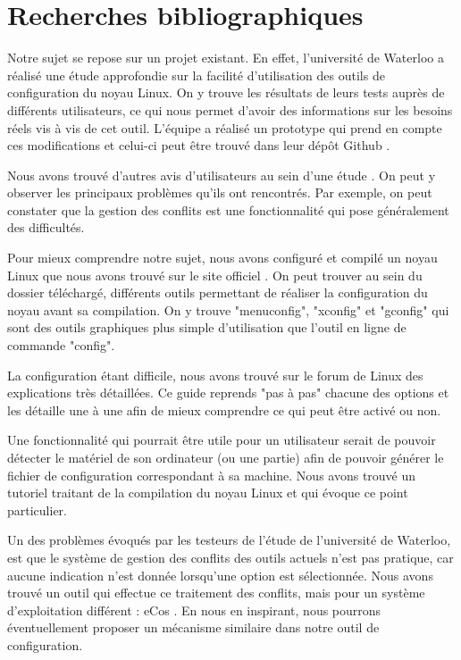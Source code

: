 \documentclass[16pts]{report}
\begin{document}
\chapter{Recherches bibliographiques}

Notre sujet se repose sur un projet existant. En effet, l'université de Waterloo
a réalisé une étude approfondie \cite{Waterloo:Etude} sur la facilité
d'utilisation des outils de configuration du noyau Linux. On y trouve les
résultats de leurs tests auprès de différents utilisateurs, ce qui nous permet
d'avoir des informations sur les besoins réels vis à vis de cet outil. L'équipe
a réalisé un prototype qui prend en compte ces modifications et celui-ci peut
être trouvé dans leur dépôt Github \cite{Waterloo:Github}.

Nous avons trouvé d'autres avis d'utilisateurs au sein d'une étude
\cite{Hubaux:2012:USC:2110147.2110164}. On peut y observer les principaux
problèmes qu'ils ont rencontrés. Par exemple, on peut constater que la gestion
des conflits est une fonctionnalité qui pose généralement des difficultés.

Pour mieux comprendre notre sujet, nous avons configuré et compilé un noyau
Linux que nous avons trouvé sur le site officiel \cite{Kernel}. On peut trouver
au sein du dossier téléchargé, différents outils permettant de réaliser la
configuration du noyau avant sa compilation. On y trouve "menuconfig", "xconfig"
et "gconfig" qui sont des outils graphiques plus simple d'utilisation que
l'outil en ligne de commande "config".

La configuration étant difficile, nous avons trouvé sur le forum de Linux
\cite{Existant:Kernel:ForumTutoConfig} des explications très détaillées. Ce
guide reprends "pas à pas" chacune des options et les détaille une à une afin de
mieux comprendre ce qui peut être activé ou non.

Une fonctionnalité qui pourrait être utile pour un utilisateur serait de pouvoir
détecter le matériel de son ordinateur (ou une partie) afin de pouvoir générer
le fichier de configuration correspondant à sa machine. Nous avons trouvé un
tutoriel \cite{Existant:Kernel:outils} traitant de la compilation du noyau Linux
et qui évoque ce point particulier.

Un des problèmes évoqués par les testeurs de l'étude \cite{Waterloo:Etude} de
l'université de Waterloo, est que le système de gestion des conflits des outils
actuels n'est pas pratique, car aucune indication n'est donnée lorsqu'une option
est sélectionnée. Nous avons trouvé un outil qui effectue ce traitement des
conflits, mais pour un système d'exploitation différent : eCos
\cite{Existant:EcosConfig}. En nous en inspirant, nous pourrons éventuellement
proposer un mécanisme similaire dans notre outil de configuration.
\end{document}
